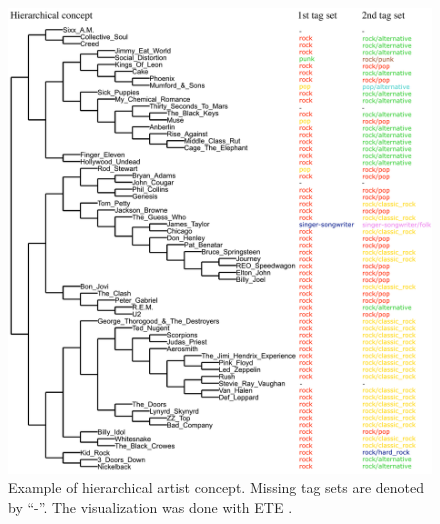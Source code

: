 \documentclass[conference]{IEEEtran}
\newcommand{\inquotes}[1]{``#1''}
\begin{document}
\begin{figure}
\begin{center}
\includegraphics[width=1.55\columnwidth]{figures/artist-hierarchy-example.pdf}
\end{center}
\caption{Example of hierarchical artist concept. Missing tag sets are denoted by \inquotes{-}. The visualization was done with ETE \cite{HuertaCepas16}.}
\label{fig:artisttree}
\end{figure}
\end{document}
